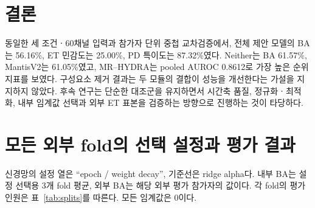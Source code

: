 \documentclass[11pt,a4paper]{article}
\numberwithin{equation}{section}
\begin{document}
\section{결론}
동일한 세 조건ㆍ60채널 입력과 참가자 단위 중첩 교차검증에서,
전체 제안 모델의 BA는 56.16\%, ET 민감도는 25.00\%, PD 특이도는 87.32\%였다.
Neither는 BA 61.57\%, MantisV2는 61.05\%였고,
MR--HYDRA는 pooled AUROC 0.8612로 가장 높은 순위 지표를 보였다.
구성요소 제거 결과는 두 모듈의 결합이 성능을 개선한다는 가설을 지지하지 않았다.
후속 연구는 단순한 대조군을 유지하면서 시간축 품질, 정규화ㆍ최적화,
내부 임계값 선택과 외부 ET 표본을 검증하는 방향으로 진행하는 것이 타당하다.

\clearpage\appendix
\section{모든 외부 fold의 선택 설정과 평가 결과}
\small
신경망의 설정 열은 ``epoch / weight decay'', 기준선은 ridge alpha다.
내부 BA는 설정 선택용 3개 fold 평균, 외부 BA는 해당 외부 평가 참가자의 값이다.
각 fold의 평가 인원은 표~\ref{tab:splits}를 따른다. 모든 임계값은 0이다.
\end{document}
